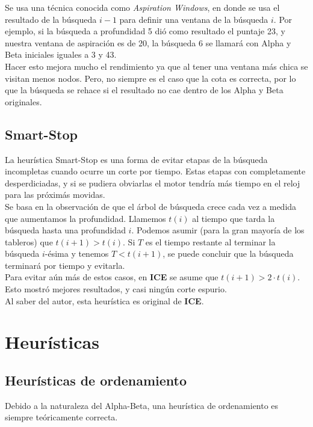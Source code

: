 \documentclass{article}
\newcommand{\ICE}[0]{{\bf ICE}}
\begin{document}
\begin{multicols}{2}
Se usa una técnica conocida como \emph{Aspiration Windows}, en donde se
usa el resultado de la búsqueda $i - 1$ para definir una ventana de la
búsqueda $i$. Por ejemplo, si la búsqueda a profundidad 5 dió como
resultado el puntaje 23, y nuestra ventana de aspiración es de 20, la
búsqueda 6 se llamará con Alpha y Beta iniciales iguales a 3 y 43.
\\

Hacer esto mejora mucho el rendimiento ya que al tener una ventana más
chica se visitan menos nodos. Pero, no siempre es el caso que la cota
es correcta, por lo que la búsqueda se rehace si el resultado no cae
dentro de los Alpha y Beta originales.

\subsection{Smart-Stop}

La heurística Smart-Stop es una forma de evitar etapas de la búsqueda
incompletas cuando ocurre un corte por tiempo. Estas etapas con
completamente desperdiciadas, y si se pudiera obviarlas el motor
tendría más tiempo en el reloj para las próximás movidas.
\\

Se basa en la observación de que el árbol de búsqueda crece cada vez
a medida que aumentamos la profundidad. Llamemos $t(i)$ al tiempo que
tarda la búsqueda hasta una profundidad $i$. Podemos asumir (para la
gran mayoría de los tableros) que $t(i+1) > t(i)$. Si $T$ es el tiempo
restante al terminar la búsqueda $i$-ésima y tenemos $T < t(i+1)$, se
puede concluir que la búsqueda terminará por tiempo y evitarla.
\\

Para evitar aún más de estos casos, en \ICE{} se asume que $t(i+1) >
2 \cdot t(i)$. Esto mostró mejores resultados, y casi ningún corte
espurio.
\\

Al saber del autor, esta heurística es original de \ICE{}.

\section{Heurísticas}

\subsection{Heurísticas de ordenamiento}

Debido a la naturaleza del Alpha-Beta, una heurística de ordenamiento
es siempre teóricamente correcta.


\end{multicols}
\end{document}
